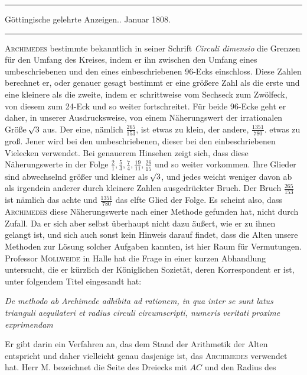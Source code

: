 \clearpage
{}%
\begin{center}
\rule{.85\textwidth}{.3pt}\par
Göttingische gelehrte Anzeigen.. Januar 1808.\par
\rule{.85\textwidth}{.3pt}
\end{center}
\hspace*{\parindent}\textsc{Archimedes} bestimmte bekanntlich in seiner Schrift \textit{Circuli dimensio} die Grenzen für den Umfang des Kreises, indem er ihn zwischen den Umfang eines umbeschriebenen und den eines einbeschriebenen 96-Ecks einschloss. Diese Zahlen berechnet er, oder genauer gesagt bestimmt er eine größere Zahl als die erste und eine kleinere als die zweite, indem er schrittweise vom Sechseck zum Zwölfeck, von diesem zum 24-Eck und so weiter fortschreitet. Für beide 96-Ecke geht er daher, in unserer Ausdrucksweise, von einem Näherungswert der irrationalen Größe \(\mathord{{}^{}\!\surd}3\) aus. Der eine, nämlich \(\frac{265}{153}\), ist etwas zu klein, der andere, \(\frac{1351}{780}\). etwas zu groß. Jener wird bei den umbeschriebenen, dieser bei den einbeschriebenen Vielecken verwendet. Bei genauerem Hinsehen zeigt sich, dass diese Näherungswerte in der Folge \(\frac21,\frac53,\frac74,\frac{19}{11},\frac{26}{15}\) und so weiter vorkommen. Ihre Glieder sind abwechselnd größer und kleiner als \(\mathord{{}^{}\!\surd}3\), und jedes weicht weniger davon ab als irgendein anderer durch kleinere Zahlen ausgedrückter Bruch. Der Bruch \(\frac{265}{153}\) ist nämlich das achte und \(\frac{1351}{780}\) das elfte Glied der Folge. Es scheint also, dass \textsc{Archimedes} diese Näherungswerte nach einer Methode gefunden hat, nicht durch Zufall. Da er sich aber selbst überhaupt nicht dazu äußert, wie er zu ihnen gelangt ist, und sich auch sonst kein Hinweis darauf findet, dass die Alten unsere Methoden zur Lösung solcher Aufgaben kannten, ist hier Raum für Vermutungen. Professor \textsc{Mollweide} in Halle hat die Frage in einer kurzen Abhandlung untersucht, die er kürzlich der Königlichen Sozietät, deren Korrespondent er ist, unter folgendem Titel eingesandt hat:
\begin{center}\textit{De methodo ab Archimede adhibita ad rationem, in qua inter se sunt latus trianguli aequilateri et radius circuli circumscripti, numeris veritati proxime exprimendam}\end{center}
\noindent Er gibt darin ein Verfahren an, das dem Stand der Arithmetik der Alten entspricht und daher vielleicht genau dasjenige ist, das \textsc{Archimedes} verwendet hat. Herr M. bezeichnet die Seite des Dreiecks mit \(AC\) und den Radius des %
